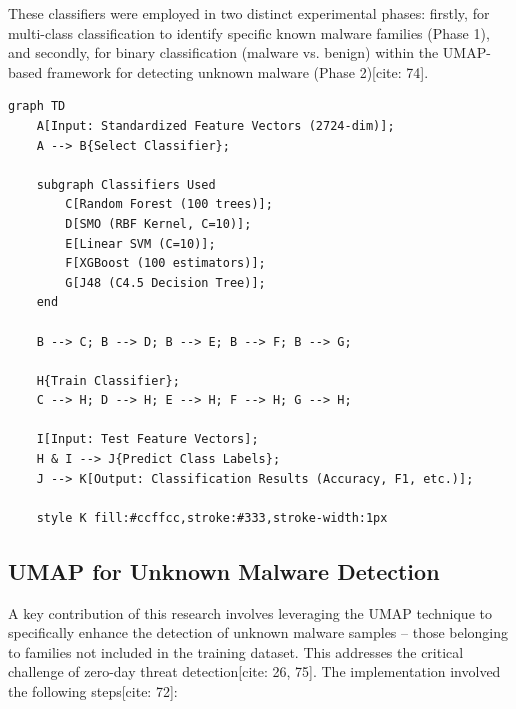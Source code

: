 These classifiers were employed in two distinct experimental phases: firstly, for multi-class classification to identify specific known malware families (Phase 1), and secondly, for binary classification (malware vs. benign) within the UMAP-based framework for detecting unknown malware (Phase 2)[cite: 74].

\begin{verbatim}
graph TD
    A[Input: Standardized Feature Vectors (2724-dim)];
    A --> B{Select Classifier};
    
    subgraph Classifiers Used
        C[Random Forest (100 trees)];
        D[SMO (RBF Kernel, C=10)];
        E[Linear SVM (C=10)];
        F[XGBoost (100 estimators)];
        G[J48 (C4.5 Decision Tree)];
    end
    
    B --> C; B --> D; B --> E; B --> F; B --> G;
    
    H{Train Classifier};
    C --> H; D --> H; E --> H; F --> H; G --> H;

    I[Input: Test Feature Vectors];
    H & I --> J{Predict Class Labels};
    J --> K[Output: Classification Results (Accuracy, F1, etc.)];
    
    style K fill:#ccffcc,stroke:#333,stroke-width:1px
\end{verbatim}

\subsection{UMAP for Unknown Malware Detection}
\label{subsec:umap_impl}

A key contribution of this research involves leveraging the UMAP technique \citep{mcinnes2018umap} to specifically enhance the detection of unknown malware samples – those belonging to families not included in the training dataset. This addresses the critical challenge of zero-day threat detection[cite: 26, 75]. The implementation involved the following steps[cite: 72]:

